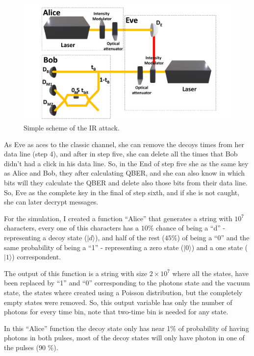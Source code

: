 \begin{refsection}
\begin{figure}[h]
\centering
\includegraphics[width=1\linewidth]{./sdf/tq_76558_cow_protocol/slides/figures/E.pdf}
\caption{Simple scheme of the IR attack.}
\label{fig:E}
\end{figure}

As Eve as aces to the classic channel, she can remove the decoys times from her data line (step 4), and after in step five, she can delete all the times that Bob didn't had a click in his data line. So, in the End of step five she as the same key as Alice and Bob, they after calculating QBER, and she can also know in which bits will they calculate the QBER and delete also those bits from their data line. So, Eve as the complete key in the final of step sixth, and if she is not caught, she can later decrypt messages.

For the simulation, I created a function ``Alice'' that generates a string with $10^7$ characters, every one of this characters has a $10 \%$ chance of being a ``d'' - representing a decoy state ($|d\rangle$), and half of the rest ($45 \%$) of being a ``0'' and the same probability of being a ``1'' - representing a zero state ($|0\rangle$) and a one state ($|1\rangle$) correspondent. 

The output of this function is a string with size $2\times10^7$ where all the states, have been replaced by ``1'' and ``0'' corresponding to the photons state and the vacuum state, the states where created using a Poisson distribution, but the completely empty states were removed. So, this output variable has only the number of photons for every time bin, note that two-time bin is needed for any state.

In this ``Alice'' function the decoy state only has near 1\% of probability of having photons in both pulses, most of the decoy states will only have photon in one of the pulses (90 \%).


\end{refsection}
